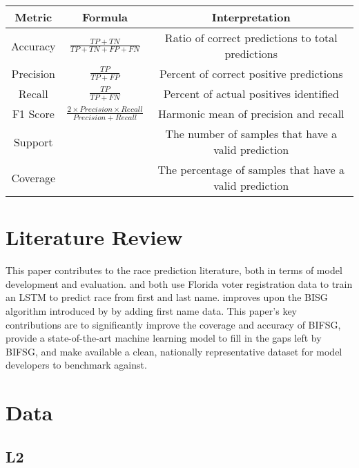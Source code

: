\documentclass[12pt]{article}
\begin{document}
\begin{table}[H]
    \centering
    \begin{tabular}{@{}ccc@{}}
    \toprule
    Metric   & Formula   & Interpretation                                    \\ \midrule
    Accuracy & \( \frac{TP + TN}{TP + TN + FP + FN} \) & Ratio of correct predictions to total predictions \\
    Precision & \( \frac{TP}{TP + FP}  \) & Percent of correct positive predictions \\
    Recall & \( \frac{TP}{TP + FN} \) & Percent of actual positives identified \\
    F1 Score & \( \frac{2 \times Precision \times Recall}{Precision + Recall} \) & Harmonic mean of precision and recall \\
    Support & & The number of samples that have a valid prediction \\
    Coverage & & The percentage of samples that have a valid prediction \\
    \bottomrule
    \end{tabular}
\end{table}

\section{Literature Review} \label{sec:literature}

This paper contributes to the race prediction literature, both in terms of model development and evaluation. \cite{sood2018} and \cite{fang2022} both use Florida voter registration data to train an LSTM to predict race from first and last name. \cite{voicu2018} improves upon the BISG algorithm introduced by \cite{elliot2009} by adding first name data. This paper's key contributions are to significantly improve the coverage and accuracy of BIFSG, provide a state-of-the-art machine learning model to fill in the gaps left by BIFSG, and make available a clean, nationally representative dataset for model developers to benchmark against.

\section{Data} \label{sec:data}

\subsection{L2}
\end{document}
